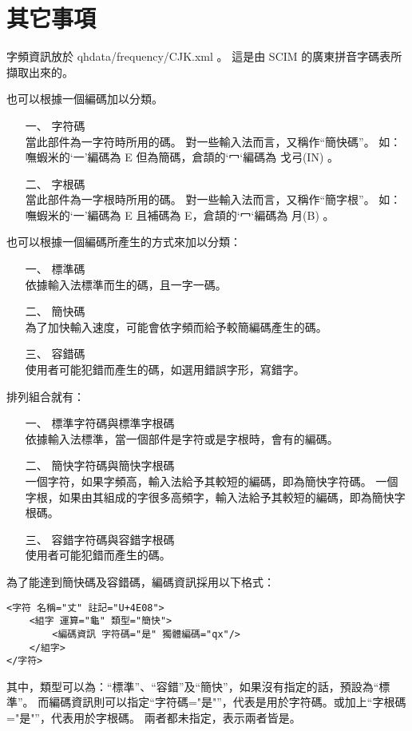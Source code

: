 ﻿\chapter{其它事項}
字頻資訊放於 qhdata/frequency/CJK.xml 。
這是由 SCIM 的廣東拼音字碼表所擷取出來的。


也可以根據一個編碼加以分類。
\begin{enumerate}
\item[一、]字符碼\\
當此部件為一字符時所用的碼。
對一些輸入法而言，又稱作``簡快碼''。
如：嘸蝦米的`一'編碼為 E 但為簡碼，倉頡的`冖‘編碼為 戈弓(IN) 。
\item[二、]字根碼\\
當此部件為一字根時所用的碼。
對一些輸入法而言，又稱作``簡字根''。
如：嘸蝦米的`一'編碼為 E 且補碼為 E，倉頡的`冖‘編碼為 月(B) 。
\end{enumerate}

也可以根據一個編碼所產生的方式來加以分類：
\begin{enumerate}
\item[一、]標準碼\\
依據輸入法標準而生的碼，且一字一碼。
\item[二、]簡快碼\\
為了加快輸入速度，可能會依字頻而給予較簡編碼產生的碼。 
\item[三、]容錯碼\\
使用者可能犯錯而產生的碼，如選用錯誤字形，寫錯字。
\end{enumerate}

排列組合就有：
\begin{enumerate}
\item[一、]標準字符碼與標準字根碼\\
依據輸入法標準，當一個部件是字符或是字根時，會有的編碼。
\item[二、]簡快字符碼與簡快字根碼\\
一個字符，如果字頻高，輸入法給予其較短的編碼，即為簡快字符碼。
一個字根，如果由其組成的字很多高頻字，輸入法給予其較短的編碼，即為簡快字根碼。
\item[三、]容錯字符碼與容錯字根碼\\
使用者可能犯錯而產生的碼。
\end{enumerate}

為了能達到簡快碼及容錯碼，編碼資訊採用以下格式：
\listXML\begin{lstlisting}
<字符 名稱="丈" 註記="U+4E08">
	<組字 運算="龜" 類型="簡快">
		<編碼資訊 字符碼="是" 獨體編碼="qx"/>
	</組字>
</字符>
\end{lstlisting}

其中，類型可以為：``標準''、``容錯''及``簡快''，如果沒有指定的話，預設為``標準''。
而編碼資訊則可以指定``字符碼="是"''，代表是用於字符碼。或加上``字根碼="是"''，代表用於字根碼。
兩者都未指定，表示兩者皆是。

